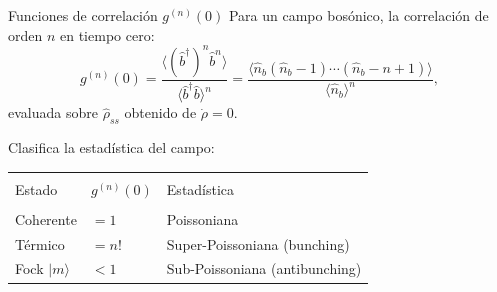 \documentclass[
11pt,notheorems,hyperref={pdfauthor=whatever}
]{beamer}
\begin{document}
\begin{frame}{Funciones de correlación $g^{(n)}(0)$}
	\vspace{-10pt}
	Para un campo bosónico, la correlación de orden $n$ en tiempo cero:
	\begin{equation*}
		g^{(n)}(0) = \frac{\langle(\hat{b}^\dagger)^n\hat{b}^n\rangle}
		{\langle\hat{b}^\dagger\hat{b}\rangle^n}
		= \frac{\langle\hat{n}_b(\hat{n}_b-1)\cdots(\hat{n}_b-n+1)\rangle}
		{\langle\hat{n}_b\rangle^n},
	\end{equation*}
	evaluada sobre $\hat{\rho}_{ss}$ obtenido de $\dot{\rho}=0$.
	
	\vspace{15pt}
	Clasifica la estadística del campo:
	
	\vspace{4pt}
	\begin{center}
		\begin{tabular}{lll}
			\hline\\[-8pt]
			Estado & $g^{(n)}(0)$ & Estadística \\[2pt]
			\hline\\[-6pt]
			Coherente  & $= 1$   & Poissoniana \\[4pt]
			Térmico    & $= n!$  & Super-Poissoniana (bunching) \\[4pt]
			Fock $|m\rangle$ & $< 1$ & Sub-Poissoniana (antibunching) \\[4pt]
			\hline
		\end{tabular}
	\end{center}
	
\end{frame}
\end{document}
